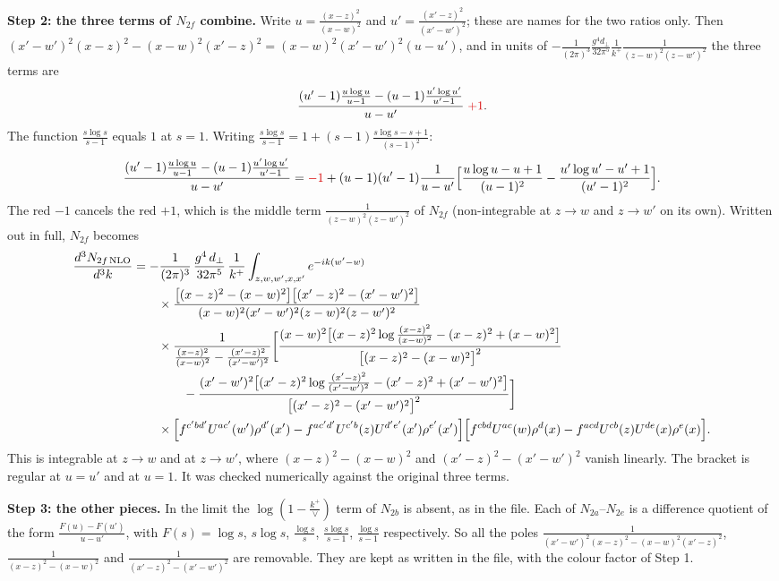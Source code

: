 \documentclass[9pt]{article}
\newcommand{\R}[1]{{\color{cR}#1}}
\numberwithin{equation}{section}
\begin{document}
\noindent\textbf{Step 2: the three terms of $N_{2f}$ combine.} Write $u=\frac{(x-z)^{2}}{(x-w)^{2}}$ and $u'=\frac{(x'-z)^{2}}{(x'-w')^{2}}$; these are names for the two ratios only. Then $(x'-w')^{2}(x-z)^{2}-(x-w)^{2}(x'-z)^{2}=(x-w)^{2}(x'-w')^{2}(u-u')$, and in units of $-\frac{1}{(2\pi)^{3}}\frac{g^{4}d_{\perp}}{32\pi^{5}}\frac{1}{k^{+}}\frac{1}{(z-w)^{2}(z-w')^{2}}$ the three terms are
\begin{equation}
\frac{(u'-1)\frac{u\log u}{u-1}-(u-1)\frac{u'\log u'}{u'-1}}{u-u'}\;\R{+1}.
\end{equation}
The function $\frac{s\log s}{s-1}$ equals $1$ at $s=1$. Writing $\frac{s\log s}{s-1}=1+(s-1)\frac{s\log s-s+1}{(s-1)^{2}}$:
\begin{equation}
\frac{(u'-1)\frac{u\log u}{u-1}-(u-1)\frac{u'\log u'}{u'-1}}{u-u'}=\R{-1}+(u-1)(u'-1)\frac{1}{u-u'}\Big[\frac{u\log u-u+1}{(u-1)^{2}}-\frac{u'\log u'-u'+1}{(u'-1)^{2}}\Big].
\end{equation}
The \R{red} $-1$ cancels the \R{red} $+1$, which is the middle term $\frac{1}{(z-w)^{2}(z-w')^{2}}$ of $N_{2f}$ (non-integrable at $z\to w$ and $z\to w'$ on its own). Written out in full, $N_{2f}$ becomes
\begin{align}
\frac{d^{3}N_{2f\,\rm NLO}}{d^{3}k}&=-\frac{1}{(2\pi)^{3}}\,\frac{g^{4}\,d_{\perp}}{32\pi^{5}}\,\frac{1}{k^{+}}\int_{z,w,w',x,x'}e^{-ik(w'-w)}\notag\\&\qquad\times\frac{\big[(x-z)^{2}-(x-w)^{2}\big]\big[(x'-z)^{2}-(x'-w')^{2}\big]}{(x-w)^{2}(x'-w')^{2}(z-w)^{2}(z-w')^{2}}\notag\\&\qquad\times\frac{1}{\frac{(x-z)^{2}}{(x-w)^{2}}-\frac{(x'-z)^{2}}{(x'-w')^{2}}}\bigg[\frac{(x-w)^{2}\big[(x-z)^{2}\log\frac{(x-z)^{2}}{(x-w)^{2}}-(x-z)^{2}+(x-w)^{2}\big]}{\big[(x-z)^{2}-(x-w)^{2}\big]^{2}}\bigg.\notag\\&\qquad\qquad\bigg.-\frac{(x'-w')^{2}\big[(x'-z)^{2}\log\frac{(x'-z)^{2}}{(x'-w')^{2}}-(x'-z)^{2}+(x'-w')^{2}\big]}{\big[(x'-z)^{2}-(x'-w')^{2}\big]^{2}}\bigg]\notag\\&\qquad\times\Big[f^{c'bd'}U^{ac'}(w')\rho^{d'}(x')-f^{ac'd'}U^{c'b}(z)U^{d'e'}(x')\rho^{e'}(x')\Big]\Big[f^{cbd}U^{ac}(w)\rho^{d}(x)-f^{acd}U^{cb}(z)U^{de}(x)\rho^{e}(x)\Big].
\end{align}
This is integrable at $z\to w$ and at $z\to w'$, where $(x-z)^{2}-(x-w)^{2}$ and $(x'-z)^{2}-(x'-w')^{2}$ vanish linearly. The bracket is regular at $u=u'$ and at $u=1$. It was checked numerically against the original three terms.

\noindent\textbf{Step 3: the other pieces.} In the limit the $\log(1-\frac{k^{+}}{\vee})$ term of $N_{2b}$ is absent, as in the file. Each of $N_{2a}$--$N_{2e}$ is a difference quotient of the form $\frac{F(u)-F(u')}{u-u'}$, with $F(s)=\log s$, $s\log s$, $\frac{\log s}{s}$, $\frac{s\log s}{s-1}$, $\frac{\log s}{s-1}$ respectively. So all the poles $\frac{1}{(x'-w')^{2}(x-z)^{2}-(x-w)^{2}(x'-z)^{2}}$, $\frac{1}{(x-z)^{2}-(x-w)^{2}}$ and $\frac{1}{(x'-z)^{2}-(x'-w')^{2}}$ are removable. They are kept as written in the file, with the colour factor of Step 1.
\end{document}
